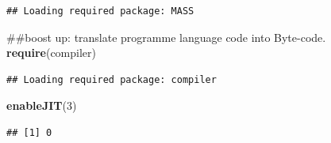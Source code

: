 \documentclass[]{article}
\newenvironment{Shaded}{\begin{snugshade}}{\end{snugshade}}
\newcommand{\KeywordTok}[1]{\textcolor[rgb]{0.13,0.29,0.53}{\textbf{{#1}}}}
\newcommand{\DecValTok}[1]{\textcolor[rgb]{0.00,0.00,0.81}{{#1}}}
\newcommand{\NormalTok}[1]{{#1}}
\begin{document}
\begin{verbatim}
## Loading required package: MASS
\end{verbatim}

\begin{Shaded}
\begin{Highlighting}[]
\NormalTok{##boost up: translate programme language code into Byte-code.}
\KeywordTok{require}\NormalTok{(compiler)}
\end{Highlighting}
\end{Shaded}

\begin{verbatim}
## Loading required package: compiler
\end{verbatim}

\begin{Shaded}
\begin{Highlighting}[]
\KeywordTok{enableJIT}\NormalTok{(}\DecValTok{3}\NormalTok{)}
\end{Highlighting}
\end{Shaded}

\begin{verbatim}
## [1] 0
\end{verbatim}
\end{document}
